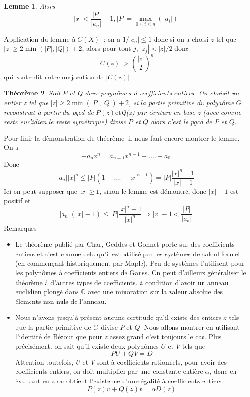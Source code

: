 \documentclass[a4paper,11pt]{article}
\newtheorem{thm}{Théorème}
\newtheorem{lemma}[thm]{Lemme}
\begin{document}
\begin{giacjshere}
\begin{lemma}
  Alors~
  \[ \text{$| x | < \frac{| P |}{| a_n |} + 1, | P | = \max_{0 \leqslant i
     \leqslant n} ( | a_i | )$} \]
\end{lemma}

Application du lemme à $C(X)$~: on a $1/|c_n|\leq 1$
donc si on a choisi $z$ tel que $| z | \geqslant 2 \min ( | P |, | Q | ) + 2$,
alors pour tout $j$, $| z_j | < | z | / 2$ donc
\[ | C ( z ) | > \left( \frac{| z |}{2} \right)^n \]
qui contredit notre majoration de $| C ( z ) |$.

\begin{thm}
  Soit $P$ et Q deux polynômes à coefficients entiers. On
  choisit un entier z tel que $| z | \geqslant 2 \min ( | P |, | Q | ) + 2$,
  si la partie primitive du polynôme $G$ reconstruit à partir du pgcd de $P (
  z ) \mbox{et}$Q(z) par écriture en base $z$ (avec comme reste euclidien le
  reste symétrique) divise $P$ et $Q$ alors c'est le pgcd de $P$ et $Q$.
\end{thm}

Pour finir la démonstration du théorème, il nous faut encore montrer le lemme.
On a
\[ - a_n x^n = a_{n - 1} x^{n - 1} + \ldots . + a_0 \]
Donc
\[ | a_n | | x |^n \leqslant | P | ( 1 + \ldots . + | x |^{n - 1} ) = | P |
   \frac{| x |^n - 1}{| x | - 1} \]
Ici on peut supposer que $| x | \geqslant 1$, sinon le lemme est démontré,
donc $| x | - 1$ est positif et
\[ | a_n | ( | x | - 1 ) \leqslant | P | \frac{| x |^n - 1}{| x |^n}
   \Rightarrow | x | - 1 < \frac{| P |}{| a_n |} \]
Remarques
\begin{itemize}
  \item Le théorème publié par Char, Geddes et Gonnet 
  porte sur des coefficients entiers et
  c'est comme cela qu'il est utilisé par les systèmes de calcul formel (en
  commençant historiquement par Maple). Peu de systèmes l'utilisent pour les
  polynômes à coefficients entiers de Gauss. On peut d'ailleurs généraliser le
  théorème à d'autres types de coefficients, à condition d'avoir un anneau
  euclidien plongé dans $\mathbb{C}$ avec une minoration sur la valeur absolue
  des élements non nuls de l'anneau.
  
  \item Nous n'avons jusqu'à présent aucune certitude qu'il existe des entiers
  $z$ tels que la partie primitive de $G$ divise $P$ et $Q$. Nous allons
  montrer en utilisant l'identité de Bézout que pour $z$ assez grand c'est
  toujours le cas. Plus précisément, on sait qu'il existe deux polynômes $U$
  et $V$ tels que
  \[ P U + Q V = D \]
  Attention toutefois, $U$ et $V$ sont à coefficients rationnels, pour avoir
  des coefficients entiers, on doit multiplier par une constante entière
  $\alpha$, donc en évaluant en $z$ on obtient l'existence d'une égalité à
  coefficients entiers
  \[ P ( z ) u + Q ( z ) v = \alpha D ( z ) \]
  

\end{itemize}
\end{giacjshere}
\end{document}
